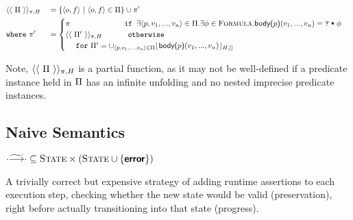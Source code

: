 \documentclass {llncs}
\begin{document}
  \begin{scenter}
        \begin{alignat*}{2}
        	    & \gerasurePerm{\perm}
            &&= \{ \langle{o}, {f}\rangle ~\vert~ \langle{o}, {f}\rangle \in \perm \} \cup \pi' \\
            &  \mathtt{where~} \pi' 
            &&= 
            		\begin{cases}
            		\pi \quad\quad\quad\quad\quad\quad\quad\ttt{if } \exists \langle p, v_1, ..., v_n \rangle \in \perm. \exists \phi \in \setFormula. \body{p}(v_1,...,v_n) = \withqm{\phi}\\
            		\gerasurePerm{\perm'} \quad\quad\quad~\ttt{otherwise} \\
            		\mathtt{~~~~for~} \perm' = \cup_{\langle p, v_1, ... , v_n \rangle \in \perm} \dynamicFP {H} {[]} {\body{p}(v_1, ..., v_n)}
            		\end{cases} \\
        \end{alignat*}
    \end{scenter}

Note, $\gerasurePerm{\perm}$ is a partial function, as it may not be well-defined if a predicate instance held in $\perm$ has an infinite unfolding and no nested imprecise predicate instances.

\subsection{Naive Semantics}
$ \cdot \gsstepArrow \cdot \subseteq \setProgramState \times ( \setProgramState \cup \{ \error \})$

\noindent A trivially correct but expensive strategy of adding runtime assertions to each execution step, checking whether the new state would be valid (preservation), right before actually transitioning into that state (progress).
\end{document}
